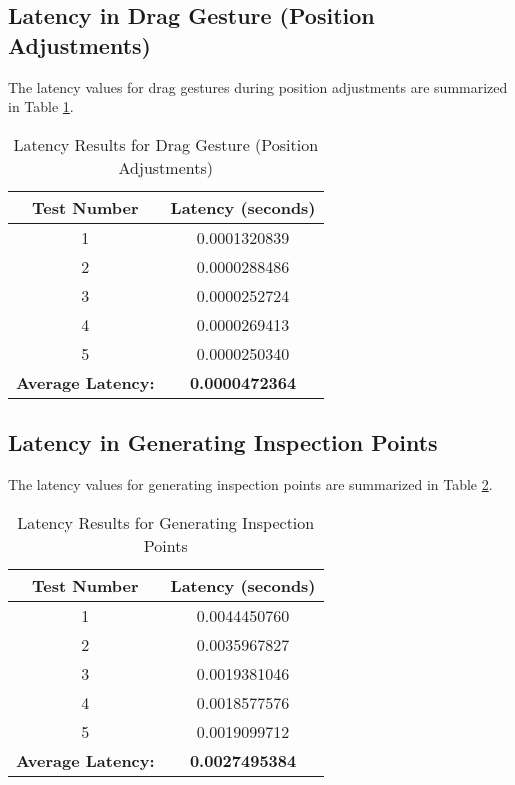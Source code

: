 \subsection{Latency in Drag Gesture (Position Adjustments)}
The latency values for drag gestures during position adjustments are summarized in Table \ref{tab:drag_gesture_latency}.

\begin{table}[h!]
    \centering
    \caption{Latency Results for Drag Gesture (Position Adjustments)}
    \label{tab:drag_gesture_latency}
    \begin{tabular}{|c|c|}
        \hline
        \textbf{Test Number} & \textbf{Latency (seconds)} \\
        \hline
        1 & 0.0001320839 \\
        2 & 0.0000288486 \\
        3 & 0.0000252724 \\
        4 & 0.0000269413 \\
        5 & 0.0000250340 \\
        \hline
        \multicolumn{1}{|r|}{\textbf{Average Latency:}} & \textbf{0.0000472364} \\
        \hline
    \end{tabular}
\end{table}

\subsection{Latency in Generating Inspection Points}
The latency values for generating inspection points are summarized in Table \ref{tab:inspection_points_latency}.

\begin{table}[h!]
    \centering
    \caption{Latency Results for Generating Inspection Points}
    \label{tab:inspection_points_latency}
    \begin{tabular}{|c|c|}
        \hline
        \textbf{Test Number} & \textbf{Latency (seconds)} \\
        \hline
        1 & 0.0044450760 \\
        2 & 0.0035967827 \\
        3 & 0.0019381046 \\
        4 & 0.0018577576 \\
        5 & 0.0019099712 \\
        \hline
        \multicolumn{1}{|r|}{\textbf{Average Latency:}} & \textbf{0.0027495384} \\
        \hline
    \end{tabular}
\end{table}

